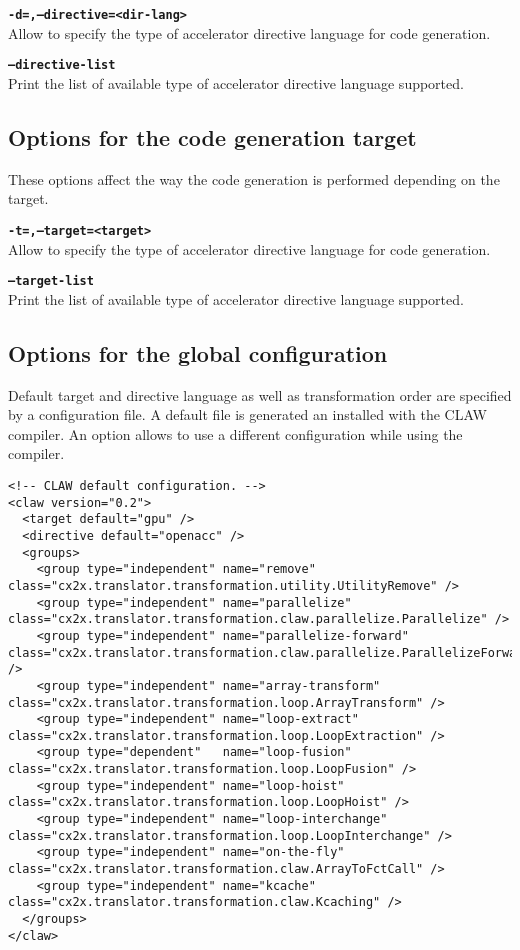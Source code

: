 \documentclass{article}
\begin{document}
\textbf{\texttt{-d=,--directive=<dir-lang>}}\\
Allow to specify the type of accelerator directive language for code generation.

\textbf{\texttt{--directive-list}}\\
Print the list of available type of accelerator directive language supported.

\subsection{Options for the code generation target}
These options affect the way the code generation is performed depending on the target.

\textbf{\texttt{-t=,--target=<target>}}\\
Allow to specify the type of accelerator directive language for code generation.
   
\textbf{\texttt{--target-list}}\\
Print the list of available type of accelerator directive language supported.

\subsection{Options for the global configuration}
Default target and directive language as well as transformation order are specified
by a configuration file. 
A default file is generated an installed with the CLAW compiler. An option allows to 
use a different configuration while using the compiler. 

\begin{lstlisting}
<!-- CLAW default configuration. -->
<claw version="0.2">
  <target default="gpu" />
  <directive default="openacc" />
  <groups>
    <group type="independent" name="remove"              class="cx2x.translator.transformation.utility.UtilityRemove" />
    <group type="independent" name="parallelize"         class="cx2x.translator.transformation.claw.parallelize.Parallelize" />
    <group type="independent" name="parallelize-forward" class="cx2x.translator.transformation.claw.parallelize.ParallelizeForward" />
    <group type="independent" name="array-transform"     class="cx2x.translator.transformation.loop.ArrayTransform" />
    <group type="independent" name="loop-extract"        class="cx2x.translator.transformation.loop.LoopExtraction" />
    <group type="dependent"   name="loop-fusion"         class="cx2x.translator.transformation.loop.LoopFusion" />
    <group type="independent" name="loop-hoist"          class="cx2x.translator.transformation.loop.LoopHoist" />
    <group type="independent" name="loop-interchange"    class="cx2x.translator.transformation.loop.LoopInterchange" />
    <group type="independent" name="on-the-fly"          class="cx2x.translator.transformation.claw.ArrayToFctCall" />
    <group type="independent" name="kcache"              class="cx2x.translator.transformation.claw.Kcaching" />
  </groups>
</claw>
\end{lstlisting}
\end{document}
